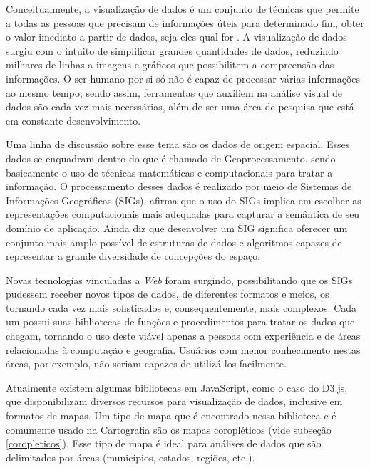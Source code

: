 \documentclass[12pt]{article}
\begin{document}
Conceitualmente, a visualização de dados é um conjunto de técnicas que permite a todas as pessoas que precisam de informações úteis para determinado fim, obter o valor imediato a partir de dados, seja eles qual for \citep{visudados}. A visualização de dados surgiu com o intuito de simplificar grandes quantidades de dados, reduzindo milhares de linhas a imagens e gráficos que possibilitem a compreensão das informações. O ser humano por si só não é capaz de processar várias informações ao mesmo tempo, sendo assim, ferramentas que auxiliem na análise visual de dados são cada vez mais necessárias, além de ser uma área de pesquisa que está em constante desenvolvimento.

Uma linha de discussão sobre esse tema são os dados de origem espacial. Esses dados se enquadram dentro do que é chamado de Geoprocessamento, sendo basicamente o uso de técnicas matemáticas e computacionais para tratar a informação. O processamento desses dados é realizado por meio de Sistemas de Informações Geográficas (SIGs). \citet{bdgeo} afirma que o uso do SIGs implica em escolher as representações computacionais mais adequadas para capturar a semântica de seu domínio de aplicação. Ainda diz que desenvolver um SIG significa oferecer um conjunto mais amplo possível de estruturas de dados e algoritmos capazes de representar a grande diversidade de concepções do espaço.

Novas tecnologias vinculadas a \emph{Web} foram surgindo, possibilitando que os SIGs pudessem receber novos tipos de dados, de diferentes formatos e meios, os tornando cada vez mais sofisticados e, consequentemente, mais complexos. Cada um possui suas bibliotecas de funções e procedimentos para tratar os dados que chegam, tornando o uso deste viável apenas a pessoas com experiência e de áreas relacionadas à computação e geografia. Usuários com menor conhecimento nestas áreas, por exemplo, não seriam capazes de utilizá-los facilmente.%

Atualmente existem algumas bibliotecas em JavaScript, como o caso do D3.js, que disponibilizam diversos recursos para visualização de dados, inclusive em formatos de mapas. Um tipo de mapa que é encontrado nessa biblioteca e é comumente usado na Cartografia são os mapas coropléticos (vide subseção \ref{coropleticos}). Esse tipo de mapa é ideal para análises de dados que são delimitados por áreas (municípios, estados, regiões, etc.).
\end{document}
